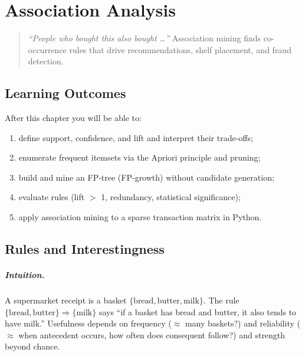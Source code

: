 \chapter{Association Analysis}
\label{ch:association}

\begin{quote}
\emph{``People who bought this also bought \dots''} Association mining finds co-occurrence rules that drive recommendations, shelf placement, and fraud detection.
\end{quote}

\noindent{}
\vspace{0.4em}

\section*{Learning Outcomes}
After this chapter you will be able to:
\begin{enumerate}[label=(L\arabic*)]
    \item define support, confidence, and lift and interpret their trade-offs;
    \item enumerate frequent itemsets via the Apriori principle and pruning;
    \item build and mine an FP-tree (FP-growth) without candidate generation;
    \item evaluate rules (lift $>$ 1, redundancy, statistical significance);
    \item apply association mining to a sparse transaction matrix in Python.
\end{enumerate}

\section{Rules and Interestingness}
\label{sec:rules}
\paragraph{Intuition.} A supermarket receipt is a basket $\{ \text{bread}, \text{butter}, \text{milk}\}$. The rule $\{ \text{bread},\text{butter}\}\Rightarrow\{\text{milk}\}$ says ``if a basket has bread and butter, it also tends to have milk.'' Usefulness depends on frequency ($\approx$ many baskets?) and reliability ($\approx$ when antecedent occurs, how often does consequent follow?) and strength beyond chance.

